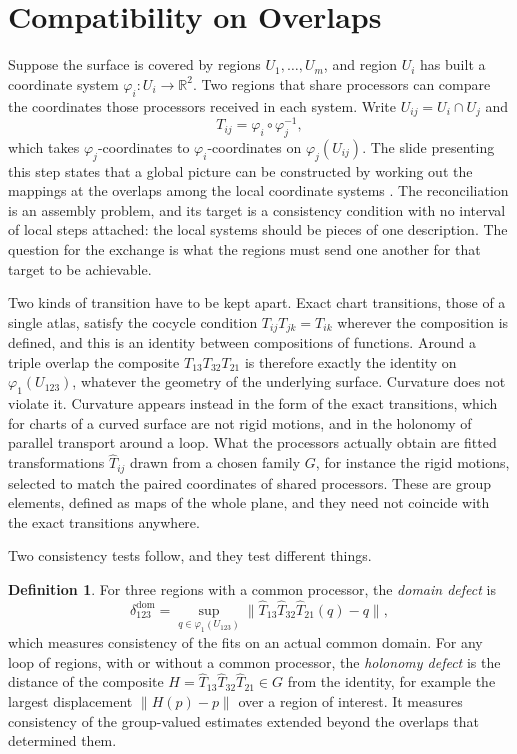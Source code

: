 \documentclass[11pt]{article}
\theoremstyle{definition}
\newtheorem{definition}{Definition}
\theoremstyle{plain}
\theoremstyle{remark}
\newcommand{\R}{\mathbb{R}}
\begin{document}
\section{Compatibility on Overlaps}\label{sec:overlaps}

Suppose the surface is covered by regions $U_1,\dots,U_m$, and region $U_i$ has built a coordinate system $\varphi_i:U_i\to\R^2$. Two regions that share processors can compare the coordinates those processors received in each system. Write $U_{ij}=U_i\cap U_j$ and
\[
T_{ij}=\varphi_i\circ\varphi_j^{-1},
\]
which takes $\varphi_j$-coordinates to $\varphi_i$-coordinates on $\varphi_j(U_{ij})$. The slide presenting this step states that a global picture can be constructed by working out the mappings at the overlaps among the local coordinate systems \cite{darpa1998}. The reconciliation is an assembly problem, and its target is a consistency condition with no interval of local steps attached: the local systems should be pieces of one description. The question for the exchange is what the regions must send one another for that target to be achievable.

Two kinds of transition have to be kept apart. Exact chart transitions, those of a single atlas, satisfy the cocycle condition $T_{ij}T_{jk}=T_{ik}$ wherever the composition is defined, and this is an identity between compositions of functions. Around a triple overlap the composite $T_{13}T_{32}T_{21}$ is therefore exactly the identity on $\varphi_1(U_{123})$, whatever the geometry of the underlying surface. Curvature does not violate it. Curvature appears instead in the form of the exact transitions, which for charts of a curved surface are not rigid motions, and in the holonomy of parallel transport around a loop. What the processors actually obtain are fitted transformations $\hat T_{ij}$ drawn from a chosen family $G$, for instance the rigid motions, selected to match the paired coordinates of shared processors. These are group elements, defined as maps of the whole plane, and they need not coincide with the exact transitions anywhere.

Two consistency tests follow, and they test different things.

\begin{definition}
For three regions with a common processor, the \emph{domain defect} is
\[
\delta^{\mathrm{dom}}_{123}=\sup_{q\in\varphi_1(U_{123})}\bigl\|\hat T_{13}\hat T_{32}\hat T_{21}(q)-q\bigr\|,
\]
which measures consistency of the fits on an actual common domain. For any loop of regions, with or without a common processor, the \emph{holonomy defect} is the distance of the composite $H=\hat T_{13}\hat T_{32}\hat T_{21}\in G$ from the identity, for example the largest displacement $\|H(p)-p\|$ over a region of interest. It measures consistency of the group-valued estimates extended beyond the overlaps that determined them.
\end{definition}
\end{document}
